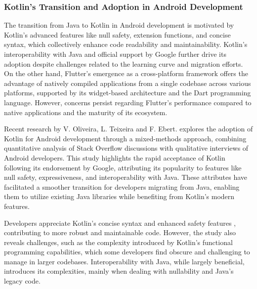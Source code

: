 \subsubsection*{Kotlin's Transition and Adoption in Android Development}
The transition from Java to Kotlin in Android development is motivated by Kotlin's advanced features like null safety, extension functions, and concise syntax, which collectively enhance code readability and maintainability. Kotlin's interoperability with Java and official support by Google further drive its adoption despite challenges related to the learning curve and migration efforts\cite{hegedHus2022static}. On the other hand, Flutter's emergence as a cross-platform framework offers the advantage of natively compiled applications from a single codebase across various platforms, supported by its widget-based architecture and the Dart programming language\cite{mazuera2022taxonomy}. However, concerns persist regarding Flutter's performance compared to native applications and the maturity of its ecosystem.
\par
Recent research by V. Oliveira, L. Teixeira and F. Ebert. \cite{oliveira2020adoption} explores the adoption of Kotlin for Android development through a mixed-methods approach, combining quantitative analysis of Stack Overflow discussions with qualitative interviews of Android developers. This study highlights the rapid acceptance of Kotlin following its endorsement by Google, attributing its popularity to features like null safety, expressiveness, and interoperability with Java. These attributes have facilitated a smoother transition for developers migrating from Java, enabling them to utilize existing Java libraries while benefiting from Kotlin's modern features.
\par
Developers appreciate Kotlin's concise syntax and enhanced safety features \cite{oliveira2020adoption}, contributing to more robust and maintainable code. However, the study also reveals challenges, such as the complexity introduced by Kotlin’s functional programming capabilities, which some developers find obscure and challenging to manage in larger codebases. Interoperability with Java, while largely beneficial, introduces its complexities, mainly when dealing with nullability and Java's legacy code.
\par
